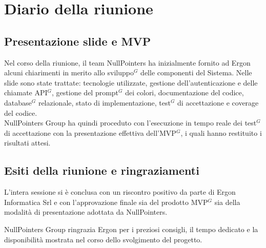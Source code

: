 \section{Diario della riunione}

\subsection{Presentazione slide e MVP}
Nel corso della riunione, il team NullPointers ha inizialmente fornito ad Ergon alcuni chiarimenti in merito allo sviluppo$^G$ delle componenti del Sistema.
Nelle slide sono state trattate: tecnologie utilizzate, gestione dell'autenticazione e delle chiamate API$^G$, gestione del prompt$^G$ dei colori, documentazione del codice, database$^G$ relazionale, stato di implementazione, test$^G$ di accettazione e coverage del codice.\\
NullPointers Group ha quindi proceduto con l’esecuzione in tempo reale dei test$^G$ di accettazione con la presentazione effettiva dell'MVP$^G$, i quali hanno restituito i risultati attesi.

\subsection{Esiti della riunione e ringraziamenti}
L’intera sessione si è conclusa con un riscontro positivo da parte di Ergon Informatica Srl e con l’approvazione finale sia del prodotto MVP$^G$ sia della modalità di presentazione adottata da NullPointers.

NullPointers Group ringrazia Ergon per i preziosi consigli, il tempo dedicato e la disponibilità mostrata nel corso dello svolgimento del progetto.